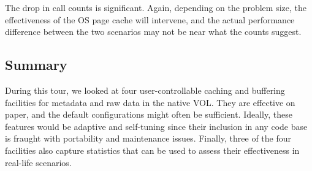 The drop in call counts is significant. Again, depending on the problem size, the effectiveness of the OS page cache will intervene, and the actual performance difference between the two scenarios may not be near what the counts suggest.

\subsection{Summary}

During this tour, we looked at four user-controllable caching and buffering facilities for metadata and raw data in the native VOL. They are effective on paper, and the default configurations might often be sufficient. Ideally, these features would be adaptive and self-tuning since their inclusion in any code base is fraught with portability and maintenance issues. Finally, three of the four facilities also capture statistics that can be used to assess their effectiveness in real-life scenarios.